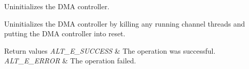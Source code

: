 Uninitializes the D\+MA controller.

Uninitializes the D\+MA controller by killing any running channel threads and putting the D\+MA controller into reset.


\begin{DoxyRetVals}{Return values}
{\em A\+L\+T\+\_\+\+E\+\_\+\+S\+U\+C\+C\+E\+SS} & The operation was successful. \\
\hline
{\em A\+L\+T\+\_\+\+E\+\_\+\+E\+R\+R\+OR} & The operation failed. \\
\hline
\end{DoxyRetVals}
